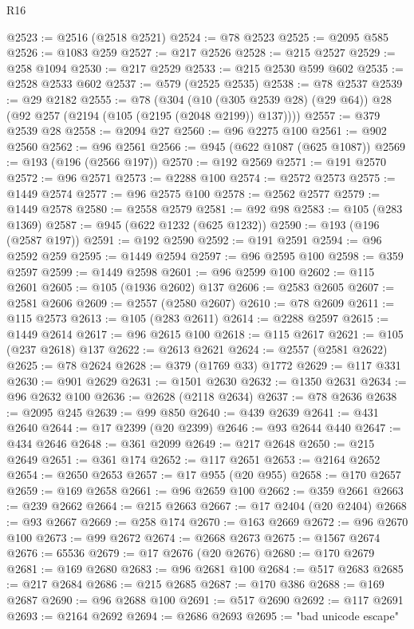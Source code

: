 \begin{lexlean}{R16}
\begin{coremodule}
@2523 := @2516 (@2518 @2521)
@2524 := @78 @2523
@2525 := @2095 @585
@2526 := @1083 @259
@2527 := @217 @2526
@2528 := @215 @2527
@2529 := @258 @1094
@2530 := @217 @2529
@2533 := @215 @2530 @599 @602
@2535 := @2528 @2533 @602
@2537 := @579 (@2525 @2535)
@2538 := @78 @2537
@2539 := @29 @2182
@2555 := @78
    (@304 (@10 (@305 @2539 @28) (@29 @64)) @28 (@92 @257 (@2194 (@105 (@2195 (@2048 @2199)) @137))))
@2557 := @379 @2539 @28
@2558 := @2094 @27
@2560 := @96 @2275 @100
@2561 := @902 @2560
@2562 := @96 @2561
@2566 := @945 (@622 @1087 (@625 @1087))
@2569 := @193 (@196 (@2566 @197))
@2570 := @192 @2569
@2571 := @191 @2570
@2572 := @96 @2571
@2573 := @2288 @100
@2574 := @2572 @2573
@2575 := @1449 @2574
@2577 := @96 @2575 @100
@2578 := @2562 @2577
@2579 := @1449 @2578
@2580 := @2558 @2579
@2581 := @92 @98
@2583 := @105 (@283 @1369)
@2587 := @945 (@622 @1232 (@625 @1232))
@2590 := @193 (@196 (@2587 @197))
@2591 := @192 @2590
@2592 := @191 @2591
@2594 := @96 @2592 @259
@2595 := @1449 @2594
@2597 := @96 @2595 @100
@2598 := @359 @2597
@2599 := @1449 @2598
@2601 := @96 @2599 @100
@2602 := @115 @2601
@2605 := @105 (@1936 @2602) @137
@2606 := @2583 @2605
@2607 := @2581 @2606
@2609 := @2557 (@2580 @2607)
@2610 := @78 @2609
@2611 := @115 @2573
@2613 := @105 (@283 @2611)
@2614 := @2288 @2597
@2615 := @1449 @2614
@2617 := @96 @2615 @100
@2618 := @115 @2617
@2621 := @105 (@237 @2618) @137
@2622 := @2613 @2621
@2624 := @2557 (@2581 @2622)
@2625 := @78 @2624
@2628 := @379 (@1769 @33) @1772
@2629 := @117 @331
@2630 := @901 @2629
@2631 := @1501 @2630
@2632 := @1350 @2631
@2634 := @96 @2632 @100
@2636 := @2628 (@2118 @2634)
@2637 := @78 @2636
@2638 := @2095 @245
@2639 := @99 @850
@2640 := @439 @2639
@2641 := @431 @2640
@2644 := @17 @2399 (@20 @2399)
@2646 := @93 @2644 @440
@2647 := @434 @2646
@2648 := @361 @2099
@2649 := @217 @2648
@2650 := @215 @2649
@2651 := @361 @174
@2652 := @117 @2651
@2653 := @2164 @2652
@2654 := @2650 @2653
@2657 := @17 @955 (@20 @955)
@2658 := @170 @2657
@2659 := @169 @2658
@2661 := @96 @2659 @100
@2662 := @359 @2661
@2663 := @239 @2662
@2664 := @215 @2663
@2667 := @17 @2404 (@20 @2404)
@2668 := @93 @2667
@2669 := @258 @174
@2670 := @163 @2669
@2672 := @96 @2670 @100
@2673 := @99 @2672
@2674 := @2668 @2673
@2675 := @1567 @2674
@2676 := 65536
@2679 := @17 @2676 (@20 @2676)
@2680 := @170 @2679
@2681 := @169 @2680
@2683 := @96 @2681 @100
@2684 := @517 @2683
@2685 := @217 @2684
@2686 := @215 @2685
@2687 := @170 @386
@2688 := @169 @2687
@2690 := @96 @2688 @100
@2691 := @517 @2690
@2692 := @117 @2691
@2693 := @2164 @2692
@2694 := @2686 @2693
@2695 := "bad unicode escape"

\end{coremodule}
\end{lexlean}
